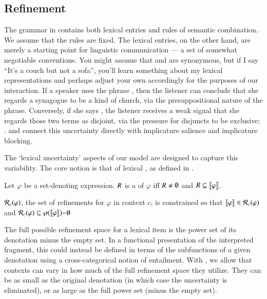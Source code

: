 \documentclass[leqno,12pt]{article}
\begin{document}

\subsection{Refinement}\label{sec:refine}


The grammar in  contains both lexical entries and
rules of semantic combination. We assume that the rules are fixed.
The lexical entries, on the other hand, are merely a starting point
for linguistic communication --- a set of somewhat negotiable
conventions. You might assume that  and  are
synonymous, but if I say ``It's a couch but not a sofa'', you'll learn
something about my lexical representations and perhaps adjust your own
accordingly for the purposes of our interaction.  If a speaker uses
the phrase , then the listener can
conclude that she regards a synagogue to be a kind of church, via the
presuppositional nature of the phrase. Conversely, if she says
, the listener receives a weak signal that
she regards those two terms as disjoint, via the pressure for
disjuncts to be exclusive;
\citep{Hurford:1974}. \citet{Chemla-HurfordCounts} and
\citet{Potts:Levy:2015} connect this uncertainty directly with
implicature salience and implicature blocking.

The `lexical uncertainty' aspects of our model are designed to capture
this variability. The core notion is that of lexical
, as defined in .
%
\begin{examples}
\item\label{refinement} 
  \begin{examples}
  \item Let $\varphi$ be a set-denoting expression. $R$ is a
     of $\varphi$ iff $R \neq \emptyset$ and
    $R \subseteq \llbracket\varphi\rrbracket$.
  \item\label{refine} $\mathcal{R}_{c}(\varphi)$, the set of refinements for
    $\varphi$ in context $c$, is constrained so that
    $\llbracket\varphi\rrbracket \in \mathcal{R}_{c}(\varphi)$ and
    $\mathcal{R}_{c}(\varphi) \subseteq \wp(\llbracket\varphi\rrbracket){-}\emptyset$
  \end{examples}
\end{examples}
%
The full possible refinement space for a lexical item is the power set
of its denotation minus the empty set. In a functional presentation of
the interpreted fragment, this could instead be defined in terms of
the subfunctions of a given denotation using a cross-categorical
notion of entailment. With , we allow that
contexts can vary in how much of the full refinement space they
utilize. They can be as small as the original denotation (in which
case the uncertainty is eliminated), or as large as the full power set
(minus the empty set).
\end{document}
